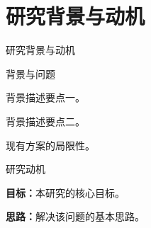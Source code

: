 \section{研究背景与动机}

\begin{frame}{研究背景与动机}

  \begin{block}{背景与问题}
    \begin{compactitem}
      \item 背景描述要点一。
      \item 背景描述要点二。
      \item 现有方案的局限性。
    \end{compactitem}
  \end{block}

  \vspace{0.30cm}
  \begin{alertblock}{研究动机}
    \begin{compactitem}
      \item \textbf{目标：}本研究的核心目标。
      \item \textbf{思路：}解决该问题的基本思路。
    \end{compactitem}
  \end{alertblock}
\end{frame}
